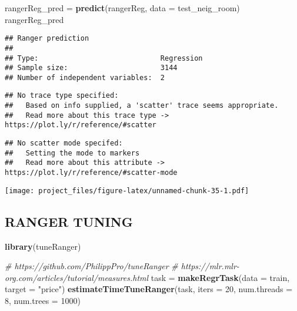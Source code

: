 \documentclass[
]{article}
\newenvironment{Shaded}{\begin{snugshade}}{\end{snugshade}}
\newcommand{\CommentTok}[1]{\textcolor[rgb]{0.56,0.35,0.01}{\textit{#1}}}
\newcommand{\DataTypeTok}[1]{\textcolor[rgb]{0.13,0.29,0.53}{#1}}
\newcommand{\DecValTok}[1]{\textcolor[rgb]{0.00,0.00,0.81}{#1}}
\newcommand{\KeywordTok}[1]{\textcolor[rgb]{0.13,0.29,0.53}{\textbf{#1}}}
\newcommand{\NormalTok}[1]{#1}
\newcommand{\OperatorTok}[1]{\textcolor[rgb]{0.81,0.36,0.00}{\textbf{#1}}}
\newcommand{\StringTok}[1]{\textcolor[rgb]{0.31,0.60,0.02}{#1}}
\begin{document}
\begin{Shaded}
\begin{Highlighting}[]
\NormalTok{rangerReg_pred =}\StringTok{ }\KeywordTok{predict}\NormalTok{(rangerReg, }\DataTypeTok{data =}\NormalTok{ test_neig_room)}
\NormalTok{rangerReg_pred}
\end{Highlighting}
\end{Shaded}

\begin{verbatim}
## Ranger prediction
## 
## Type:                             Regression 
## Sample size:                      3144 
## Number of independent variables:  2
\end{verbatim}

\begin{Shaded}
\end{Shaded}

\begin{verbatim}
## No trace type specified:
##   Based on info supplied, a 'scatter' trace seems appropriate.
##   Read more about this trace type -> https://plot.ly/r/reference/#scatter
\end{verbatim}

\begin{verbatim}
## No scatter mode specifed:
##   Setting the mode to markers
##   Read more about this attribute -> https://plot.ly/r/reference/#scatter-mode
\end{verbatim}

\texttt{[image: project\_files/figure-latex/unnamed-chunk-35-1.pdf]}

\hypertarget{ranger-tuning}{%
\subsection{RANGER TUNING}\label{ranger-tuning}}

\begin{Shaded}
\begin{Highlighting}[]
\KeywordTok{library}\NormalTok{(tuneRanger)}

\CommentTok{# https://github.com/PhilippPro/tuneRanger}
\CommentTok{# https://mlr.mlr-org.com/articles/tutorial/measures.html}
\NormalTok{task =}\StringTok{ }\KeywordTok{makeRegrTask}\NormalTok{(}\DataTypeTok{data =}\NormalTok{ train, }\DataTypeTok{target =} \StringTok{"price"}\NormalTok{)}
\KeywordTok{estimateTimeTuneRanger}\NormalTok{(task, }\DataTypeTok{iters =} \DecValTok{20}\NormalTok{, }\DataTypeTok{num.threads =} \DecValTok{8}\NormalTok{, }\DataTypeTok{num.trees =} \DecValTok{1000}\NormalTok{)}
\end{Highlighting}
\end{Shaded}
\end{document}
